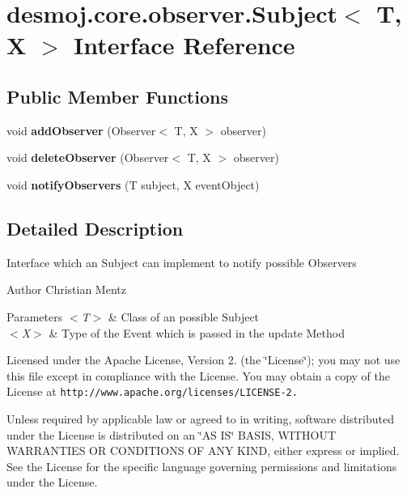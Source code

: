 \section{desmoj.\-core.\-observer.\-Subject$<$ T, X $>$ Interface Reference}
\label{interfacedesmoj_1_1core_1_1observer_1_1_subject_3_01_t_00_01_x_01_4}
\subsection*{Public Member Functions}
\begin{DoxyCompactItemize}
\item 
void {\bf add\-Observer} (Observer$<$ T, X $>$ observer)
\item 
void {\bf delete\-Observer} (Observer$<$ T, X $>$ observer)
\item 
void {\bf notify\-Observers} (T subject, X event\-Object)
\end{DoxyCompactItemize}


\subsection{Detailed Description}
Interface which an Subject can implement to notify possible Observers

\begin{DoxyAuthor}{Author}
Christian Mentz
\end{DoxyAuthor}

\begin{DoxyParams}{Parameters}
{\em $<$\-T$>$} & Class of an possible Subject \\
\hline
{\em $<$\-X$>$} & Type of the Event which is passed in the update Method\\
\hline
\end{DoxyParams}
Licensed under the Apache License, Version 2. (the \char`\"{}\-License\char`\"{}); you may not use this file except in compliance with the License. You may obtain a copy of the License at {\tt http\-://www.\-apache.\-org/licenses/\-L\-I\-C\-E\-N\-S\-E-\/2.}

Unless required by applicable law or agreed to in writing, software distributed under the License is distributed on an \char`\"{}\-A\-S I\-S\char`\"{} B\-A\-S\-I\-S, W\-I\-T\-H\-O\-U\-T W\-A\-R\-R\-A\-N\-T\-I\-E\-S O\-R C\-O\-N\-D\-I\-T\-I\-O\-N\-S O\-F A\-N\-Y K\-I\-N\-D, either express or implied. See the License for the specific language governing permissions and limitations under the License. 

